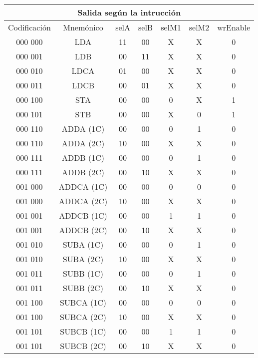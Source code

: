 \documentclass[paper=letter, fontsize=12pt]{article}
\begin{document}
\begin{table}[h]
\centering
\begin{tabular}{cc|ccccc}
\multicolumn{7}{c}{Salida según la intrucción} \\ \hline
Codificación & Mnemónico	  	& selA & selB & selM1 & selM2 & wrEnable \\ \hline
000 000 		 & LDA 		  	& 11 	& 00    & X     & X     & 0 \\
000 001 		 & LDB  		& 00 	& 11    & X     & X     & 0 \\           
000 010 		 & LDCA 		& 01 	& 00    & X     & X     & 0 \\            
000 011 		 & LDCB 		& 00 	& 01    & X     & X     & 0 \\           
000 100 		 & STA  	 	& 00 	& 00    & 0     & X     & 1 \\            
000 101 		 & STB  		& 00 	& 00    & X     & 0     & 1 \\            
000 110 		 & ADDA (1C) 	& 00 	& 00    & 0     & 1     & 0 \\
000 110 		 & ADDA (2C)	& 10 	& 00    & X     & X     & 0 \\
000 111 		 & ADDB (1C)	& 00 	& 00    & 0     & 1     & 0 \\
000 111 		 & ADDB (2C)	& 00 	& 10    & X     & X     & 0 \\
001 000 		 & ADDCA (1C)	& 00 	& 00    & 0     & 0     & 0 \\
001 000 		 & ADDCA (2C) 	& 10 	& 00    & X     & X     & 0 \\
001 001 		 & ADDCB (1C) 	& 00 	& 00    & 1     & 1     & 0 \\
001 001 		 & ADDCB (2C) 	& 00 	& 10    & X     & X     & 0 \\
001 010 		 & SUBA (1C)  	& 00 	& 00    & 0     & 1     & 0 \\
001 010 		 & SUBA (2C)  	& 10 	& 00    & X     & X     & 0 \\
001 011 		 & SUBB (1C)	& 00 	& 00    & 0     & 1     & 0 \\
001 011 		 & SUBB (2C)	& 00 	& 10    & X     & X     & 0 \\
001 100 		 & SUBCA (1C)	& 00 	& 00    & 0     & 0     & 0 \\
001 100 		 & SUBCA (2C) 	& 10 	& 00    & X     & X     & 0 \\
001 101 		 & SUBCB (1C) 	& 00 	& 00    & 1     & 1     & 0 \\
001 101 		 & SUBCB (2C) 	& 00 	& 10    & X     & X     & 0 \\

\end{tabular}
\end{table}
\end{document}
